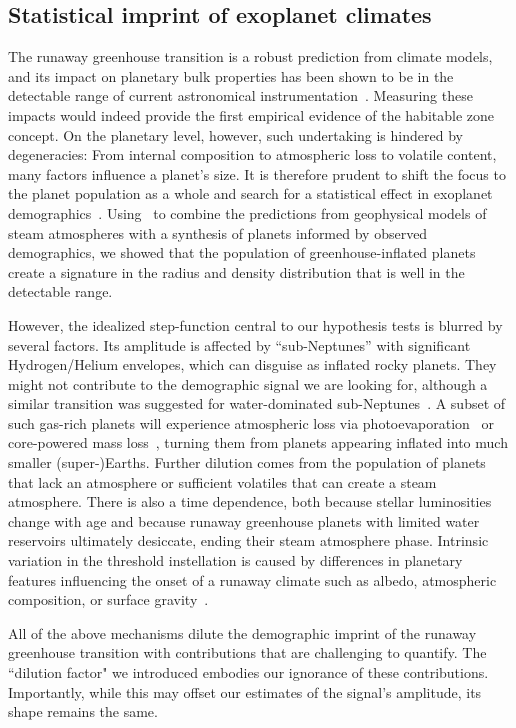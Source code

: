 \documentclass[modern]{aastex631}
\begin{document}
\subsection{Statistical imprint of exoplanet climates}
\begin{note}
The runaway greenhouse transition is a robust prediction from climate models, and its impact on planetary bulk properties has been shown to be in the detectable range of current astronomical instrumentation~\citep{Goldblatt2015}.
Measuring these impacts would indeed provide the first empirical evidence of the habitable zone concept.
On the planetary level, however, such undertaking is hindered by degeneracies: From internal composition to atmospheric loss to volatile content, many factors influence a planet's size.
It is therefore prudent to shift the focus to the planet population as a whole and search for a statistical effect in exoplanet demographics~\citep{Turbet2019}.
Using \bioverse\ to combine the predictions from geophysical models of steam atmospheres with a synthesis of planets informed by observed demographics, we showed that the population of greenhouse-inflated planets create a signature in the radius and density distribution that is well in the detectable range.

However, the idealized step-function central to our hypothesis tests is blurred by several factors.
Its amplitude is affected by ``sub-Neptunes'' with significant Hydrogen/Helium envelopes, which can disguise as inflated rocky planets.
They might not contribute to the demographic signal we are looking for, although a similar transition was suggested for water-dominated sub-Neptunes~\citep{Pierrehumbert2022}.
A subset of such gas-rich planets will experience atmospheric loss via photoevaporation~\citep{Owen2013} or core-powered mass loss~\citep{Ginzburg2018}, turning them from planets appearing inflated into much smaller \mbox{(super-)Earths}.
Further dilution comes from the population of planets that lack an atmosphere or sufficient volatiles that can create a steam atmosphere.
There is also a time dependence, both because stellar luminosities change with age and because runaway greenhouse planets with limited water reservoirs ultimately desiccate, ending their steam atmosphere phase.
Intrinsic variation in the threshold instellation is caused by differences in planetary features influencing the onset of a runaway climate such as albedo, atmospheric composition, or surface gravity~\citep{Pierrehumbert2022}.

All of the above mechanisms dilute the demographic imprint of the runaway greenhouse transition with contributions that are challenging to quantify.
The ``dilution factor" we introduced embodies our ignorance of these contributions.
Importantly, while this may offset our estimates of the signal's amplitude, its shape remains the same.


\end{note}
\end{document}
